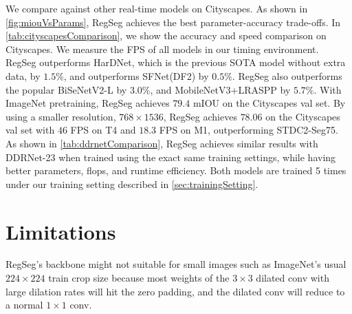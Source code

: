 \documentclass[10pt,twocolumn,letterpaper]{article}
\begin{document}
\begin{table}
  \centering
  \caption{Comparison against DDRNet-23 under the exact same training setting. FPS of both models are calculated using \cref{sec:timing}. RegSeg achieves higher FPS and better parameters and flops efficiency while maintaining similar accuracy.}
  \label{tab:ddrnetComparison}
\end{table}

We compare against other real-time models on Cityscapes. As shown in \cref{fig:miouVsParams}, RegSeg achieves the best parameter-accuracy trade-offs. In \cref{tab:cityscapesComparison}, we show the accuracy and speed comparison on Cityscapes. We measure the FPS of all models in our timing environment. RegSeg outperforms HarDNet\cite{hardnet}, which is the previous SOTA model without extra data, by $1.5\%$, and outperforms SFNet(DF2)\cite{sfnet} by $0.5\%$. RegSeg also outperforms the popular BiSeNetV2-L\cite{bisenetv2} by $3.0\%$, and MobileNetV3+LRASPP\cite{mobilenetv32019} by $5.7\%$. With ImageNet pretraining, RegSeg achieves $79.4$ mIOU on the Cityscapes val set. By using a smaller resolution, $768\times 1536$, RegSeg achieves $78.06$ on the Cityscapes val set with $46$ FPS on T4 and $18.3$ FPS on M1, outperforming STDC2-Seg75\cite{stdc}. As shown in \cref{tab:ddrnetComparison}, RegSeg achieves similar results with DDRNet-23 when trained using the exact same training settings, while having better parameters, flops, and runtime efficiency. Both models are trained 5 times under our training setting described in \cref{sec:trainingSetting}.



\section{Limitations}
RegSeg's backbone might not suitable for small images such as ImageNet's usual $224\times224$ train crop size because most weights of the $3\times3$ dilated conv with large dilation rates will hit the zero padding, and the dilated conv will reduce to a normal $1\times 1$ conv.
\end{document}
